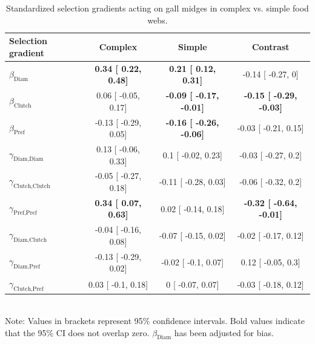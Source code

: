 \documentclass[11pt,]{article}
\begin{document}
\bigskip

\begin{table}[h]
\caption{Standardized selection gradients acting on gall midges in complex vs. simple food webs.}
\label{Table:Gradients}
\centering
\begin{tabular}{lccc}
\\ 
\hline
\textbf{Selection gradient} & \textbf{Complex} & \textbf{Simple} & \textbf{Contrast}  \\ 
\hline
$\beta_{\text{Diam}}$ & 
\textbf{
0.34 [
0.22,
0.48] }& 
\textbf{
0.21 [
0.12,
0.31] }& 

-0.14 [
-0.27,
0] \\

$\beta_{\text{Clutch}}$ & 
0.06 [
-0.05,
0.17] & 
\textbf{
-0.09 [
-0.17,
-0.01] }& 
\textbf{
-0.15 [
-0.29,
-0.03] }\\

$\beta_{\text{Pref}}$ &
-0.13 [
-0.29,
0.05] & 
\textbf{
-0.16 [
-0.26,
-0.06] }& 

-0.03 [
-0.21,
0.15] \\

$\gamma_{\text{Diam,Diam}}$ &
0.13 [
-0.06,
0.33] & 

0.1 [
-0.02,
0.23] & 

-0.03 [
-0.27,
0.2] \\

$\gamma_{\text{Clutch,Clutch}}$ & 
-0.05 [
-0.27,
0.18] & 

-0.11 [
-0.28,
0.03] & 

-0.06 [
-0.32,
0.2] \\

$\gamma_{\text{Pref,Pref}}$ & 
\textbf{
0.34 [
0.07,
0.63] }& 

0.02 [
-0.14,
0.18] & 
\textbf{
-0.32 [
-0.64,
-0.01] }\\

$\gamma_{\text{Diam,Clutch}}$ & 
-0.04 [
-0.16,
0.08] & 

-0.07 [
-0.15,
0.02] & 

-0.02 [
-0.17,
0.12] \\

$\gamma_{\text{Diam,Pref}}$ & 
-0.13 [
-0.29,
0.02] & 

-0.02 [
-0.1,
0.07] & 

0.12 [
-0.05,
0.3] \\

$\gamma_{\text{Clutch,Pref}}$ & 
0.03 [
-0.1,
0.18] & 

0 [
-0.07,
0.07] & 

-0.03 [
-0.18,
0.12] \\ 
\hline
\end{tabular}
\bigskip{}
\\
{\footnotesize Note: Values in brackets represent 95\% confidence intervals. Bold values indicate that the 95\% CI does not overlap zero. $\beta_{\text{Diam}}$ has been adjusted for bias.}
\end{table}
\end{document}
